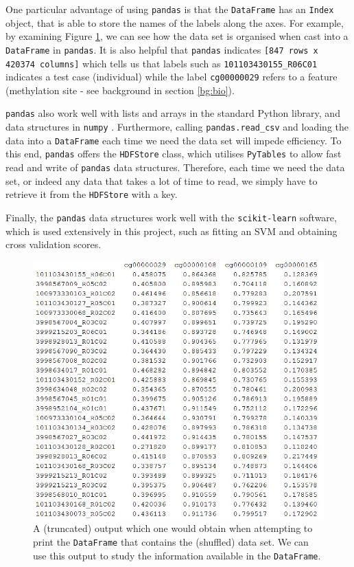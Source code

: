\documentclass[12pt, twoside, a4paper]{report}
\begin{document}
One particular advantage of using \texttt{pandas} is that the \texttt{DataFrame} has an \texttt{Index} object, that is able to store the names of the labels along the axes. For example, by examining Figure \ref{data:pandas:example}, we can see how the data set is organised when cast into a \texttt{DataFrame} in \texttt{pandas}. It is also helpful that \texttt{pandas} indicates \texttt{[847 rows x 420374 columns]} which tells us that labels such as \texttt{101103430155\_R06C01} indicates a test case (individual) while the label \texttt{cg00000029} refers to a feature (methylation site - see background in section \ref{bg:bio}).

\texttt{pandas} also work well with lists and arrays in the standard Python library, and data structures in \texttt{numpy} \cite{RefWorks:214}. Furthermore, calling \texttt{pandas.read\_csv} and loading the data into a \texttt{DataFrame} each time we need the data set will impede efficiency. To this end, \texttt{pandas} offers the \texttt{HDFStore} class, which utilises \texttt{PyTables} \cite{pytables} to allow fast read and write of \texttt{pandas} data structures. Therefore, each time we need the data set, or indeed any data that takes a lot of time to read, we simply have to retrieve it from the \texttt{HDFStore} with a key.

Finally, the \texttt{pandas} data structures work well with the \texttt{scikit-learn} software, which is used extensively in this project, such as fitting an SVM and obtaining cross validation scores.

\begin{figure}
\centering
\includegraphics[scale=0.9]{images/pandas-example.JPG}
\caption{A (truncated) output which one would obtain when attempting to print the \texttt{DataFrame} that contains the (shuffled) data set. We can use this output to study the information available in the \texttt{DataFrame}.}
\label{data:pandas:example}
\end{figure}
\end{document}
